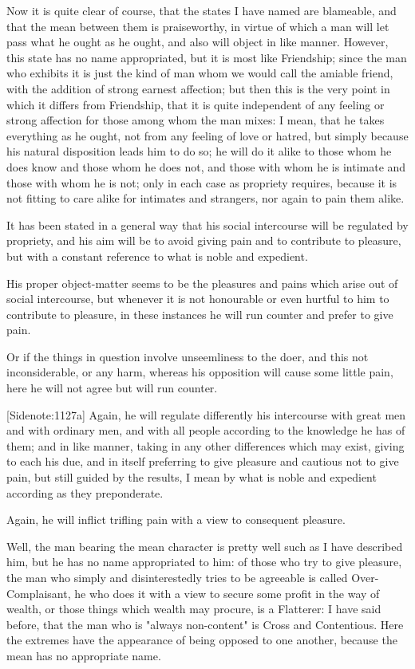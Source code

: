 Now it is quite clear of course, that the states I have named are
blameable, and that the mean between them is praiseworthy, in virtue
of which a man will let pass what he ought as he ought, and also will
object in like manner. However, this state has no name appropriated, but
it is most like Friendship; since the man who exhibits it is just the
kind of man whom we would call the amiable friend, with the addition of
strong earnest affection; but then this is the very point in which it
differs from Friendship, that it is quite independent of any feeling or
strong affection for those among whom the man mixes: I mean, that he
takes everything as he ought, not from any feeling of love or hatred,
but simply because his natural disposition leads him to do so; he will
do it alike to those whom he does know and those whom he does not, and
those with whom he is intimate and those with whom he is not; only in
each case as propriety requires, because it is not fitting to care
alike for intimates and strangers, nor again to pain them alike.

It has been stated in a general way that his social intercourse will be
regulated by propriety, and his aim will be to avoid giving pain and to
contribute to pleasure, but with a constant reference to what is noble
and expedient.

His proper object-matter seems to be the pleasures and pains which arise
out of social intercourse, but whenever it is not honourable or even
hurtful to him to contribute to pleasure, in these instances he will run
counter and prefer to give pain.

Or if the things in question involve unseemliness to the doer, and this
not inconsiderable, or any harm, whereas his opposition will cause some
little pain, here he will not agree but will run counter.

[Sidenote:1127a] Again, he will regulate differently his intercourse
with great men and with ordinary men, and with all people according to
the knowledge he has of them; and in like manner, taking in any other
differences which may exist, giving to each his due, and in itself
preferring to give pleasure and cautious not to give pain, but still
guided by the results, I mean by what is noble and expedient according
as they preponderate.

Again, he will inflict trifling pain with a view to consequent pleasure.

Well, the man bearing the mean character is pretty well such as I have
described him, but he has no name appropriated to him: of those who try
to give pleasure, the man who simply and disinterestedly tries to be
agreeable is called Over-Complaisant, he who does it with a view to
secure some profit in the way of wealth, or those things which wealth
may procure, is a Flatterer: I have said before, that the man who is
"always non-content" is Cross and Contentious. Here the extremes have
the appearance of being opposed to one another, because the mean has no
appropriate name.



